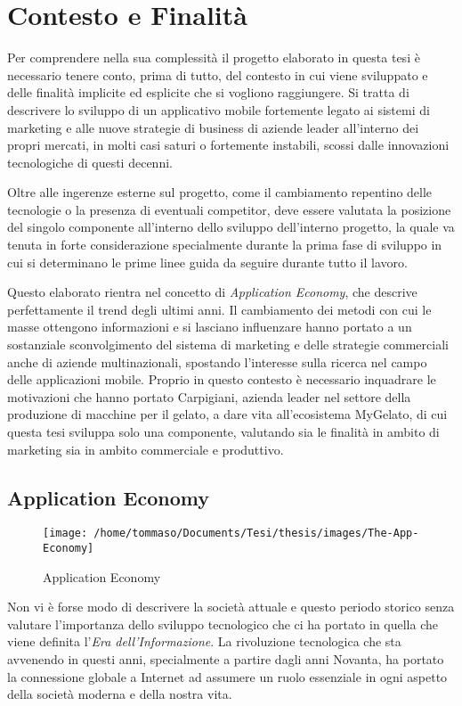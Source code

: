
\chapter{Contesto e Finalità}

Per comprendere nella sua complessità il progetto elaborato in questa
tesi è necessario tenere conto, prima di tutto, del contesto in cui
viene sviluppato e delle finalità implicite ed esplicite che si vogliono
raggiungere. Si tratta di descrivere lo sviluppo di un applicativo
mobile fortemente legato ai sistemi di marketing e alle nuove strategie
di business di aziende leader all'interno dei propri mercati, in molti
casi saturi o fortemente instabili, scossi dalle innovazioni tecnologiche
di questi decenni.

Oltre alle ingerenze esterne sul progetto, come il cambiamento repentino
delle tecnologie o la presenza di eventuali competitor, deve essere
valutata la posizione del singolo componente all'interno dello sviluppo
dell'interno progetto, la quale va tenuta in forte considerazione
specialmente durante la prima fase di sviluppo in cui si determinano
le prime linee guida da seguire durante tutto il lavoro.

Questo elaborato rientra nel concetto di \textit{Application Economy},
che descrive perfettamente il trend degli ultimi anni. Il cambiamento
dei metodi con cui le masse ottengono informazioni e si lasciano influenzare
hanno portato a un sostanziale sconvolgimento del sistema di marketing
e delle strategie commerciali anche di aziende multinazionali, spostando
l'interesse sulla ricerca nel campo delle applicazioni mobile. Proprio
in questo contesto è necessario inquadrare le motivazioni che hanno
portato Carpigiani, azienda leader nel settore della produzione di
macchine per il gelato, a dare vita all'ecosistema MyGelato, di cui
questa tesi sviluppa solo una componente, valutando sia le finalità
in ambito di marketing sia in ambito commerciale e produttivo.

\section{Application Economy}

\begin{figure}[h]
\texttt{[image: /home/tommaso/Documents/Tesi/thesis/images/The-App-Economy]}
\caption{Application Economy}
\label{fig:appEconomy1} 
\end{figure}

Non vi è forse modo di descrivere la società attuale e questo periodo
storico senza valutare l'importanza dello sviluppo tecnologico che
ci ha portato in quella che viene definita l'\textit{Era dell'Informazione}.
La rivoluzione tecnologica che sta avvenendo in questi anni, specialmente
a partire dagli anni Novanta, ha portato la connessione globale a
Internet ad assumere un ruolo essenziale in ogni aspetto della società
moderna e della nostra vita.

